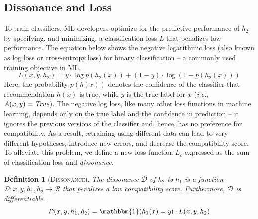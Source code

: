 \documentclass[letterpaper]{article} %
\newcommand{\bug}
    {\mbox{\rule{2mm}{2mm}}}
\newcommand{\Bug}[1]
    {\bug \footnote{BUG: {#1}}}
\newcommand{\ie}{\mbox{\it i.e.}}
\newcommand{\?}{\mbox{?}}
\newcommand{\hone}{\mbox{$h_1$}}
\newcommand{\htwo}{\mbox{$h_2$}}
\newcommand{\loss}{L}
\newcommand{\lossbc}{\loss_c}
\newcommand{\dissonance}{\mathcal{D}}
\newtheorem*{definition}{Definition}
\begin{document}
\subsection{Dissonance and Loss}
To train classifiers, ML developers optimize for the predictive performance of $\htwo$
by specifying, and minimizing, a classification loss $\loss$ that penalizes low performance. The equation below shows the negative logarithmic loss (also known as log loss or cross-entropy loss) for binary classification -- a commonly used training objective in ML. 
\begin{equation*}
    \label{eq:logloss}
    \loss(x, y, \htwo) = y \cdot \log p(\htwo(x)) + (1 - y) \cdot \log (1 - p(\htwo(x)))
\end{equation*}
Here, the probability $p(h(x))$ denotes the confidence of the classifier that recommendation $h(x)$ is true, while $y$ is the true label for $x$ (\ie, $A(x, y) = \mbox{\em True}$).
The negative log loss, like many other loss functions in machine learning, depends only on the true label and the confidence in prediction -- it ignores the previous versions of the classifier and, hence, has no preference for compatibility. As a result, retraining using different data can lead to very different hypotheses, introduce new errors, and decrease the compatibility score. 
To alleviate this problem, we define a new loss function $\lossbc$ expressed as the sum of classification loss and {\em dissonance}.

\begin{definition}[\textsc{Dissonance}]
The dissonance $\dissonance$ of $\htwo$ to $\hone$ is a function $\dissonance: x, y, \hone, \htwo \rightarrow \mathcal{R}$ that penalizes a low compatibility score. Furthermore, $\dissonance$ is differentiable.
\begin{equation}
    \label{eq:diss}
    \dissonance(x, y, \hone, \htwo) = \mathbbm{1}(\hone(x) = y) \cdot \loss(x, y, \htwo)
\end{equation}
\end{definition}
\end{document}

